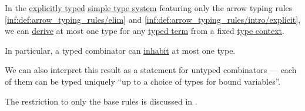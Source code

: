 \begin{proposition}\label{thm:typed_term_habitation_uniqueness}
  In the \hyperref[def:simple_type_system_style]{explicitly typed} \hyperref[def:simple_type_system]{simple type system} featuring only the arrow typing rules \ref{inf:def:arrow_typing_rules/elim} and \ref{inf:def:arrow_typing_rules/intro/explicit}, we can \hyperref[def:simple_type_derivability]{derive} at most one type for any \hyperref[def:typed_lambda_term]{typed term} from a fixed \hyperref[def:type_context]{type context}.
\end{proposition}
\begin{comments}
  \item In particular, a typed combinator can \hyperref[def:type_habitation]{inhabit} at most one type.

  \item We can also interpret this result as a statement for untyped combinators --- each of them can be typed uniquely \enquote{up to a choice of types for bound variables}.

  \item The restriction to only the base rules is discussed in .
\end{comments}
